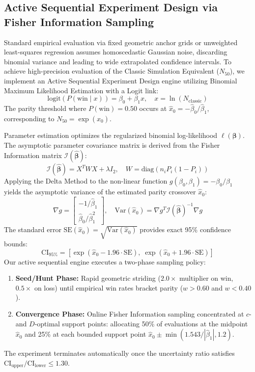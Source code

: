 \documentclass[12pt,a4paper]{article}
\begin{document}
\subsection{Active Sequential Experiment Design via Fisher Information Sampling}
Standard empirical evaluation via fixed geometric anchor grids or unweighted least-squares regression assumes homoscedastic Gaussian noise, discarding binomial variance and leading to wide extrapolated confidence intervals. To achieve high-precision evaluation of the Classic Simulation Equivalent ($N_{50}$), we implement an Active Sequential Experiment Design engine utilizing Binomial Maximum Likelihood Estimation with a Logit link:
\begin{equation}
    \text{logit}(P(\text{win} \mid x)) = \beta_0 + \beta_1 x, \quad x = \ln(N_{\text{classic}})
\end{equation}
The parity threshold where $P(\text{win}) = 0.50$ occurs at $\hat{x}_0 = -\hat{\beta}_0 / \hat{\beta}_1$, corresponding to $N_{50} = \exp(\hat{x}_0)$.

Parameter estimation optimizes the regularized binomial log-likelihood $\ell(\boldsymbol{\beta})$. The asymptotic parameter covariance matrix is derived from the Fisher Information matrix $\mathcal{I}(\hat{\boldsymbol{\beta}})$:
\begin{equation}
    \mathcal{I}(\hat{\boldsymbol{\beta}}) = X^T W X + \lambda I_2, \quad W = \text{diag}\left( n_i P_i (1 - P_i) \right)
\end{equation}
Applying the Delta Method to the non-linear function $g(\beta_0, \beta_1) = -\beta_0 / \beta_1$ yields the asymptotic variance of the estimated parity crossover $\hat{x}_0$:
\begin{equation}
    \nabla g = \begin{bmatrix} -1/\hat{\beta}_1 \\ \hat{\beta}_0 / \hat{\beta}_1^2 \end{bmatrix}, \quad \text{Var}(\hat{x}_0) = \nabla g^T \mathcal{I}(\hat{\boldsymbol{\beta}})^{-1} \nabla g
\end{equation}
The standard error $\text{SE}(\hat{x}_0) = \sqrt{\text{Var}(\hat{x}_0)}$ provides exact 95\% confidence bounds:
\begin{equation}
    \text{CI}_{95\%} = \left[ \exp(\hat{x}_0 - 1.96 \cdot \text{SE}), \; \exp(\hat{x}_0 + 1.96 \cdot \text{SE}) \right]
\end{equation}
Our active sequential engine executes a two-phase sampling policy:
\begin{enumerate}
    \item \textbf{Seed/Hunt Phase:} Rapid geometric striding ($2.0\times$ multiplier on win, $0.5\times$ on loss) until empirical win rates bracket parity ($w > 0.60$ and $w < 0.40$).
    \item \textbf{Convergence Phase:} Online Fisher Information sampling concentrated at $c$- and $D$-optimal support points: allocating 50\% of evaluations at the midpoint $\hat{x}_0$ and 25\% at each bounded support point $\hat{x}_0 \pm \min(1.543 / |\hat{\beta}_1|, 1.2)$.
\end{enumerate}
The experiment terminates automatically once the uncertainty ratio satisfies $\text{CI}_{\text{upper}} / \text{CI}_{\text{lower}} \le 1.30$.
\end{document}
